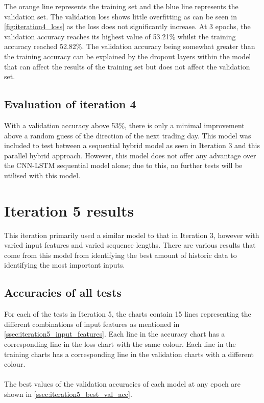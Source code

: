 The orange line represents the training set and the blue line represents
the validation set. The validation loss shows little overfitting as can be seen in
\autoref{fig:iteration4_loss} as the loss does not significantly increase. At 3 epochs,
the validation accuracy reaches its highest value of 53.21\% whilst the training accuracy reached 52.82\%. The validation accuracy being somewhat greater than the
training accuracy can be explained by the dropout layers within the model that can affect the results of the training
set but does not affect the validation set.

\subsection{Evaluation of iteration 4}
With a validation accuracy above 53\%, there is only a minimal improvement above a random guess of the direction
of the next trading day. This model was included to test between a sequential hybrid model as seen in Iteration 3
and this parallel hybrid approach. However, this model does not offer any advantage over the CNN-LSTM sequential
model alone; due to this, no further tests will be utilised with this model.

\section{Iteration 5 results}
This iteration primarily used a similar model to that in Iteration 3, however with varied input features
and varied sequence lengths. There are various results that come from this model from identifying the
best amount of historic data to identifying the most important inputs.

\subsection{Accuracies of all tests}

For each of the tests in Iteration 5, the charts contain 15 lines representing the different combinations
of input features as mentioned in \autoref{ssec:iteration5_input_features}. Each line in the accuracy chart
has a corresponding line in the loss chart with the same colour. Each line in the training charts has a 
corresponding line in the validation charts with a different colour.\\
\\
The best values of the validation accuracies of each model at any epoch are shown in
\autoref{ssec:iteration5_best_val_acc}.

